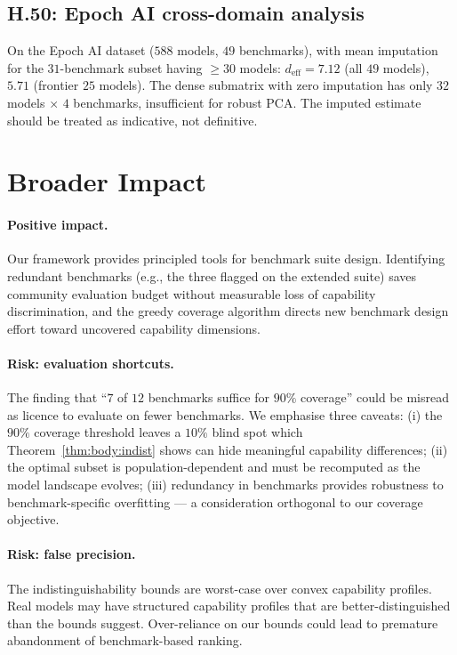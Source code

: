 \documentclass{article}
\begin{document}
\subsection*{H.50: Epoch AI cross-domain analysis}
On the Epoch AI dataset ($588$ models, $49$ benchmarks), with mean
imputation for the $31$-benchmark subset having $\ge 30$ models:
$d_{\mathrm{eff}} = 7.12$ (all $49$ models), $5.71$ (frontier
$25$ models). The dense submatrix with zero imputation has only
$32$ models $\times$ $4$ benchmarks, insufficient for robust PCA.
The imputed estimate should be treated as indicative, not definitive.

\section{Broader Impact}
\label{app:impact}

\paragraph{Positive impact.} Our framework provides principled tools
for benchmark suite design. Identifying redundant benchmarks (e.g.,
the three flagged on the extended suite) saves community evaluation
budget without measurable loss of capability discrimination, and the
greedy coverage algorithm directs new benchmark design effort toward
uncovered capability dimensions.

\paragraph{Risk: evaluation shortcuts.} The finding that
``$7$ of $12$ benchmarks suffice for $90\%$ coverage'' could be
misread as licence to evaluate on fewer benchmarks. We emphasise
three caveats: (i) the $90\%$ coverage threshold leaves a $10\%$
blind spot which Theorem~\ref{thm:body:indist} shows can hide
meaningful capability differences; (ii) the optimal subset is
population-dependent and must be recomputed as the model landscape
evolves; (iii) redundancy in benchmarks provides robustness to
benchmark-specific overfitting --- a consideration orthogonal to
our coverage objective.

\paragraph{Risk: false precision.} The indistinguishability bounds
are worst-case over convex capability profiles. Real models may
have structured capability profiles that are better-distinguished
than the bounds suggest. Over-reliance on our bounds could lead to
premature abandonment of benchmark-based ranking.
\end{document}
